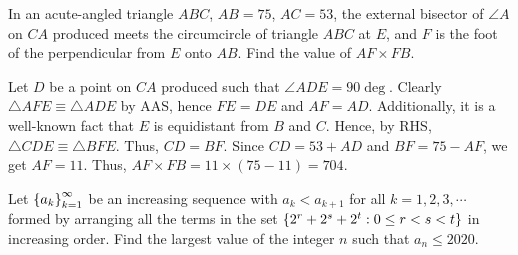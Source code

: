 \begin{question}[704]\label{A::2020-O-1-21}
    In an acute-angled triangle $ABC$, $AB = 75$, $AC = 53$, the external bisector of $\angle A$ on $CA$ produced meets the circumcircle of triangle $ABC$ at $E$, and $F$ is the foot of the perpendicular from $E$ onto $AB$. Find the value of $AF \times FB$.
\end{question}

\begin{center}
\end{center}

Let $D$ be a point on $CA$ produced such that $\angle ADE = 90\deg$. Clearly $\triangle AFE \equiv \triangle ADE$ by AAS, hence $FE = DE$ and $AF = AD$. Additionally, it is a well-known fact that $E$ is equidistant from $B$ and $C$. Hence, by RHS, $\triangle CDE \equiv \triangle BFE$. Thus, $CD = BF$. Since $CD = 53 + AD$ and $BF = 75 - AF$, we get $AF = 11$. Thus, $AF \times FB = 11 \times (75 - 11) = 704$.

\begin{question}[165]\label{A::2020-O-1-22}
    Let $\left\lbrace a_k \right\rbrace_{k=1}^\infty$ be an increasing sequence with $a_k < a_{k+1}$ for all $k = 1, 2, 3, \cdots$ formed by arranging all the terms in the set $\left\lbrace 2^r + 2^s + 2^t : 0 \leq r < s < t \right\rbrace$ in increasing order. Find the largest value of the integer $n$ such that $a_n \leq 2020$.
\end{question}

